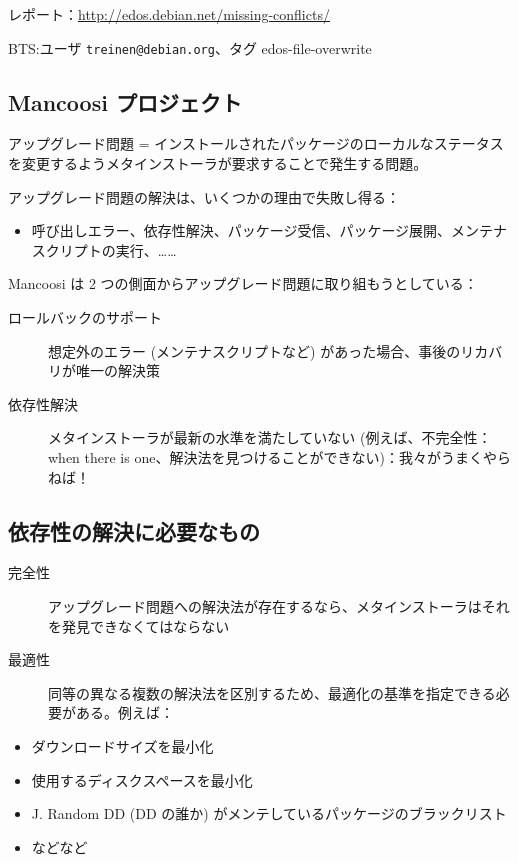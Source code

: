 \documentclass[mingoth,a4paper]{jsarticle}
\begin{document}
レポート：\url{http://edos.debian.net/missing-conflicts/}

BTS:ユーザ \verb|treinen@debian.org|、タグ edos-file-overwrite


\subsection{Mancoosi プロジェクト}

アップグレード問題 = インストールされたパッケージのローカルなステータスを変更するようメタインストーラが要求することで発生する問題。

アップグレード問題の解決は、いくつかの理由で失敗し得る：

\begin{itemize}
\item 呼び出しエラー、依存性解決、パッケージ受信、パッケージ展開、メンテナスクリプトの実行、……
\end{itemize}

Mancoosi は 2 つの側面からアップグレード問題に取り組もうとしている：

\begin{description}
\item[ロールバックのサポート] \mbox{}

想定外のエラー (メンテナスクリプトなど) があった場合、事後のリカバリが唯一の解決策
\item[依存性解決] \mbox{}

メタインストーラが最新の水準を満たしていない (例えば、不完全性：when there is one、解決法を見つけることができない)：我々がうまくやらねば！
\end{description}


\subsection{依存性の解決に必要なもの}

\begin{description}
\item[完全性] \mbox{}

アップグレード問題への解決法が存在するなら、メタインストーラはそれを発見できなくてはならない
\item[最適性] \mbox{}

同等の異なる複数の解決法を区別するため、最適化の基準を指定できる必要がある。例えば：
\end{description}

\begin{itemize}
\item ダウンロードサイズを最小化
\item 使用するディスクスペースを最小化
\item J. Random DD (DD の誰か) がメンテしているパッケージのブラックリスト
\item などなど
\end{itemize}
\end{document}
